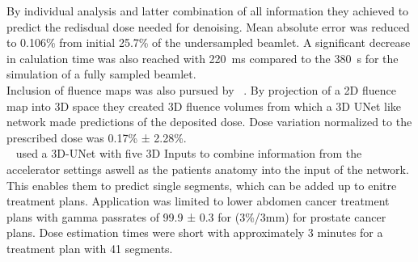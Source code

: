 By individual analysis and latter combination of all information they achieved to predict the redisdual dose needed for denoising.
Mean absolute error was reduced to 0.106\% from initial 25.7\% of the undersampled beamlet.
A significant decrease in calulation time was also reached with 220~ms compared to the 380~s for the simulation of a fully sampled beamlet.\\
Inclusion of fluence maps was also pursued by \citeauthor{fan_data-driven_2020}~\cite{fan_data-driven_2020}. By projection of a 2D fluence map into 3D space they created 3D fluence volumes from which a 3D UNet like network made predictions of the deposited dose.
Dose variation normalized to the prescribed dose was 0.17\% ± 2.28\%.\\
\citeauthor{kontaxis_deepdose_2020}~\cite{kontaxis_deepdose_2020} used a 3D-UNet with five 3D Inputs to combine information from the accelerator settings aswell as the patients anatomy into the input of the network.
This enables them to predict single segments, which can be added up to enitre treatment plans.
Application was limited to lower abdomen cancer treatment plans with gamma passrates of 99.9 ± 0.3 for (3\%/3mm) for prostate cancer plans.
Dose estimation times were short with approximately 3 minutes for a treatment plan with 41 segments.
